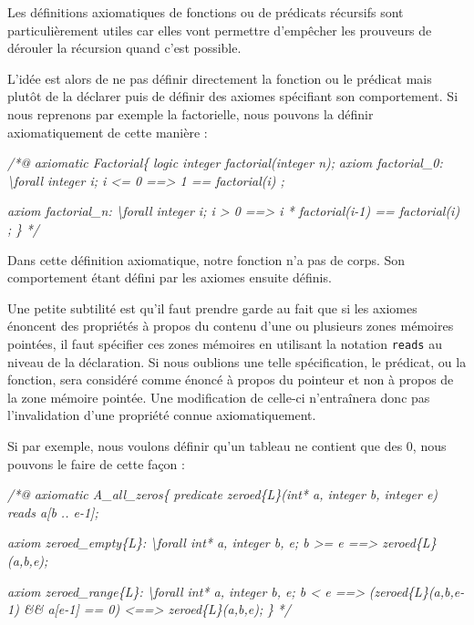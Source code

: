 \documentclass[12pt,francais,]{scrbook}
\newenvironment{Shaded}{}{}
\newcommand{\CommentTok}[1]{\textcolor[rgb]{0.38,0.63,0.69}{\textit{{#1}}}}
\begin{document}
Les définitions axiomatiques de fonctions ou de prédicats récursifs sont
particulièrement utiles car elles vont permettre d'empêcher les
prouveurs de dérouler la récursion quand c'est possible.

L'idée est alors de ne pas définir directement la fonction ou le
prédicat mais plutôt de la déclarer puis de définir des axiomes
spécifiant son comportement. Si nous reprenons par exemple la
factorielle, nous pouvons la définir axiomatiquement de cette manière :

\begin{footnotesize}\begin{Shaded}
\begin{Highlighting}[]
\CommentTok{/*@}
\CommentTok{  axiomatic Factorial\{}
\CommentTok{    logic integer factorial(integer n);}
\CommentTok{    }
\CommentTok{    axiom factorial_0:}
\CommentTok{      \textbackslash{}forall integer i; i <= 0 ==> 1 == factorial(i) ;}

\CommentTok{    axiom factorial_n:}
\CommentTok{      \textbackslash{}forall integer i; i > 0 ==> i * factorial(i-1) == factorial(i) ;}
\CommentTok{  \}}
\CommentTok{*/}
\end{Highlighting}
\end{Shaded}\end{footnotesize}

Dans cette définition axiomatique, notre fonction n'a pas de corps. Son
comportement étant défini par les axiomes ensuite définis.

Une petite
subtilité est qu'il faut prendre garde au fait que si les axiomes
énoncent des propriétés à propos du contenu d'une ou plusieurs zones
mémoires pointées, il faut spécifier ces zones mémoires en utilisant la
notation \texttt{reads} au niveau de la déclaration. Si nous oublions
une telle spécification, le prédicat, ou la fonction, sera considéré
comme énoncé à propos du pointeur et non à propos de la zone mémoire
pointée. Une modification de celle-ci n'entraînera donc pas
l'invalidation d'une propriété connue axiomatiquement.

Si par exemple, nous voulons définir qu'un tableau ne contient que des
0, nous pouvons le faire de cette façon :

\begin{footnotesize}\begin{Shaded}
\begin{Highlighting}[]
\CommentTok{/*@}
\CommentTok{  axiomatic A_all_zeros\{}
\CommentTok{    predicate zeroed\{L\}(int* a, integer b, integer e) reads a[b .. e-1];}

\CommentTok{    axiom zeroed_empty\{L\}:}
\CommentTok{      \textbackslash{}forall int* a, integer b, e; b >= e ==> zeroed\{L\}(a,b,e);}

\CommentTok{    axiom zeroed_range\{L\}:}
\CommentTok{      \textbackslash{}forall int* a, integer b, e; b < e ==>}
\CommentTok{        (zeroed\{L\}(a,b,e-1) && a[e-1] == 0) <==> zeroed\{L\}(a,b,e);}
\CommentTok{  \}}
\CommentTok{*/}
\end{Highlighting}
\end{Shaded}\end{footnotesize}
\end{document}
